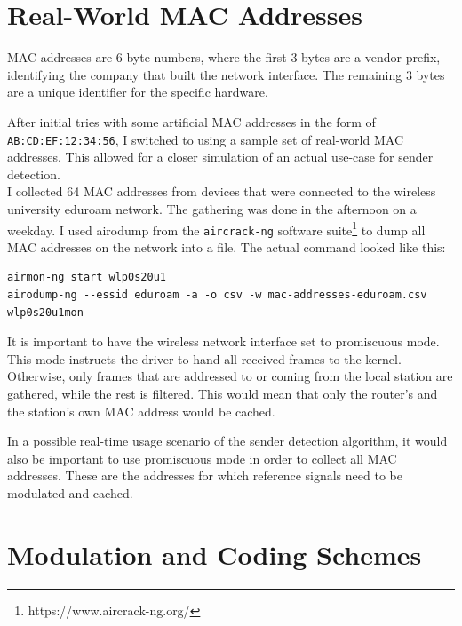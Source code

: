 \section{Real-World MAC Addresses}\label{sec:real-world-macs}

\gls{MAC} addresses are 6 byte numbers, where the first 3 bytes are a vendor prefix, identifying the company that built the network interface. The remaining 3 bytes are a unique identifier for the specific hardware.

After initial tries with some artificial \gls{MAC} addresses in the form of \texttt{AB:CD:EF:12:34:56}, I switched to using a sample set of real-world \gls{MAC} addresses. This allowed for a closer simulation of an actual use-case for sender detection.\\

I collected 64 \gls{MAC} addresses from devices that were connected to the wireless university eduroam network. The gathering was done in the afternoon on a weekday. I used airodump from the \texttt{aircrack-ng} software suite\footnote{https://www.aircrack-ng.org/} to dump all \gls{MAC} addresses on the network into a file. The actual command looked like this:

\begin{lstlisting}[captionpos=b,caption={Capture Real-World MAC Addresses},label=lst:airodump]
airmon-ng start wlp0s20u1
airodump-ng --essid eduroam -a -o csv -w mac-addresses-eduroam.csv wlp0s20u1mon
\end{lstlisting}

It is important to have the wireless network interface set to promiscuous mode. This mode instructs the driver to hand all received frames to the kernel. Otherwise, only frames that are addressed to or coming from the local station are gathered, while the rest is filtered. This would mean that only the router's and the station's own \gls{MAC} address would be cached.

In a possible real-time usage scenario of the sender detection algorithm, it would also be important to use promiscuous mode in order to collect all \gls{MAC} addresses. These are the addresses for which reference signals need to be modulated and cached.



\section{Modulation and Coding Schemes}

